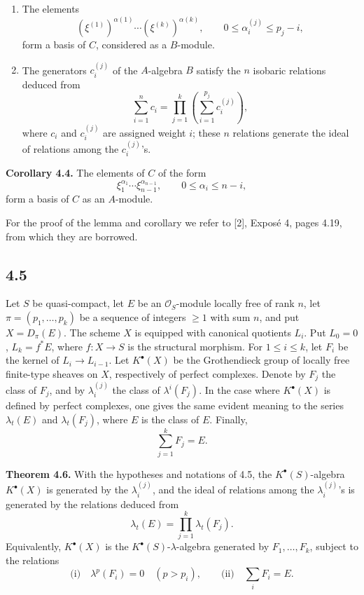 \begin{enumerate}[label=\textup{\roman*)}]
\item The elements
\[
  (\xi^{(1)})^{\alpha(1)}\cdots(\xi^{(k)})^{\alpha(k)},
  \qquad 0\leq \alpha_i^{(j)}\leq p_j-i,
\]
form a basis of \(C\), considered as a \(B\)-module.
\item The generators \(c_i^{(j)}\) of the \(A\)-algebra \(B\) satisfy the \(n\) isobaric relations deduced from
\[
  \sum_{i=1}^n c_i
  =
  \prod_{j=1}^{k}\left(\sum_{i=1}^{p_j} c_i^{(j)}\right),
\]
where \(c_i\) and \(c_i^{(j)}\) are assigned weight \(i\); these \(n\) relations generate the ideal of relations among the \(c_i^{(j)}\)'s.
\end{enumerate}

\textbf{Corollary 4.4.} The elements of \(C\) of the form
\[
  \xi_1^{\alpha_1}\cdots \xi_{n-1}^{\alpha_{n-1}},
  \qquad 0\leq \alpha_i\leq n-i,
\]
form a basis of \(C\) as an \(A\)-module.

For the proof of the lemma and corollary we refer to [2], Exposé 4, pages 4.19, from which they are borrowed.

\subsection*{4.5}
Let \(S\) be quasi-compact, let \(E\) be an \(\mathcal O_S\)-module locally free of rank \(n\), let \(\pi=(p_1,\ldots,p_k)\) be a sequence of integers \(\geq 1\) with sum \(n\), and put \(X=D_\pi(E)\). The scheme \(X\) is equipped with canonical quotients \(L_i\). Put \(L_0=0\), \(L_k=f^*E\), where \(f:X\to S\) is the structural morphism. For \(1\leq i\leq k\), let \(F_i\) be the kernel of \(L_i\to L_{i-1}\). Let \(K^\bullet(X)\) be the Grothendieck group of locally free finite-type sheaves on \(X\), respectively of perfect complexes. Denote by \(F_j\) the class of \(F_j\), and by \(\lambda_i^{(j)}\) the class of \(\lambda^i(F_j)\). In the case where \(K^\bullet(X)\) is defined by perfect complexes, one gives the same evident meaning to the series \(\lambda_t(E)\) and \(\lambda_t(F_j)\), where \(E\) is the class of \(E\). Finally,
\[
  \sum_{j=1}^{k}F_j=E.
\]

\textbf{Theorem 4.6.} With the hypotheses and notations of 4.5, the \(K^\bullet(S)\)-algebra \(K^\bullet(X)\) is generated by the \(\lambda_i^{(j)}\), and the ideal of relations among the \(\lambda_i^{(j)}\)'s is generated by the relations deduced from
\[
  \lambda_t(E)=\prod_{j=1}^{k}\lambda_t(F_j).
\]
Equivalently, \(K^\bullet(X)\) is the \(K^\bullet(S)\)-\(\lambda\)-algebra generated by \(F_1,\ldots,F_k\), subject to the relations
\[
  \text{(i)}\quad \lambda^p(F_i)=0\quad(p>p_i),
  \qquad
  \text{(ii)}\quad \sum_i F_i=E.
\]

